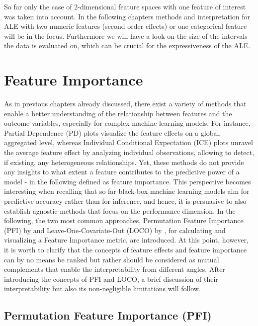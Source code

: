 \documentclass[
]{krantz}
\begin{document}
So far only the case of 2-dimensional feature spaces with one feature of interest was taken into account. In the following chapters methods and interpretation for ALE with two numeric features (second order effects) or one categorical feature will be in the focus. Furthermore we will have a look on the size of the intervals the data is evaluated on, which can be crucial for the expressiveness of the ALE.

\hypertarget{feature-importance}{%
\chapter{Feature Importance}\label{feature-importance}}

As in previous chapters already discussed, there exist a variety of methods that enable a better understanding of the relationship between features and the outcome variables, especially for complex machine learning models. For instance, Partial Dependence (PD) plots visualize the feature effects on a global, aggregated level, whereas Individual Conditional Expectation (ICE) plots unravel the average feature effect by analyzing individual observations, allowing to detect, if existing, any heterogeneous relationships. Yet, these methods do not provide any insights to what extent a feature contributes to the predictive power of a model - in the following defined as feature importance. This perspective becomes interesting when recalling that so far black-box machine learning models aim for predictive accuracy rather than for inference, and hence, it is persuasive to also establish agnostic-methods that focus on the performance dimension. In the following, the two most common approaches, Permutation Feature Importance (PFI) by \citet{breiman2001random} and Leave-One-Covariate-Out (LOCO) by \citet{lei2018distribution}, for calculating and visualizing a Feature Importance metric, are introduced. At this point, however, it is worth to clarify that the concepts of feature effects and feature importance can by no means be ranked but rather should be considered as mutual complements that enable the interpretability from different angles. After introducing the concepts of PFI and LOCO, a brief discussion of their interpretability but also its non-negligible limitations will follow.

\hypertarget{permutation-feature-importance-pfi}{%
\section{Permutation Feature Importance (PFI)}\label{permutation-feature-importance-pfi}}
\end{document}

